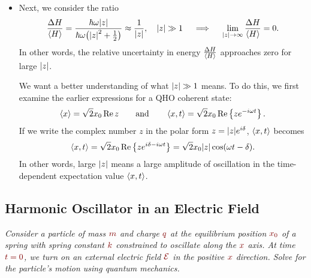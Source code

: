 \documentclass[11pt, a4paper]{article}
\newcommand{\dmath}[1]{\textcolor{Maroon}{#1}}  %
\newcommand{\eqtext}[1]{\qquad \text{#1} \qquad}
\begin{document}
\begin{itemize}
	\item Next, we consider the ratio
	\begin{equation*}
		\frac{\Delta H}{\ev{H}} = \frac{\hbar \omega \abs{z}}{\hbar \omega \big(\abs{z}^{2} + \tfrac{1}{2}\big)} \approx \frac{1}{\abs{z}}, \quad \abs{z} \gg 1 \quad \implies \quad \lim_{\abs{z} \to \infty} \frac{\Delta H}{\ev{H}} = 0.
	\end{equation*}
	In other words, the relative uncertainty in energy $ \frac{\Delta H}{\ev{H}} $ approaches zero for large $ \abs{z} $. 
	
	We want a better understanding of what  $ \abs{z} \gg 1 $ means. To do this, we first examine the earlier expressions for a QHO coherent state:
	\begin{equation*}
		\ev{x} = \sqrt{2}x_{0}\Re z \eqtext{and} \ev{x, t} = \sqrt{2}x_{0}\Re \left\{ze^{-i\omega t}\right\}.
	\end{equation*}
	If we write the complex number $ z $ in the polar form $ z = \abs{z}e^{i\delta} $, $ \ev{x, t}  $ becomes
	\begin{equation*}
		\ev{x, t}  =  \sqrt{2}x_{0}\Re \left\{ze^{i\delta -i\omega t}\right\} = \sqrt{2}x_{0}\abs{z}\cos(\omega t - \delta  ).
	\end{equation*}
	In other words, large $ \abs{z} $ means a large amplitude of oscillation in the time-dependent expectation value $ \ev{x, t} $. 
	
\end{itemize}

\subsection{Harmonic Oscillator in an Electric Field}
\textit{Consider a particle of mass $ \dmath{m} $ and charge $ \dmath{q} $ at the equilibrium position $ \dmath{x_{0}} $ of a spring with spring constant $ \dmath{k} $ constrained to oscillate along the $ \dmath{x} $ axis. At time $ \dmath{t = 0} $, we turn on an external electric field $ \dmath{\mathcal{E}} $ in the positive $ \dmath{x} $ direction. Solve for the particle's motion using quantum mechanics. }
\end{document}
